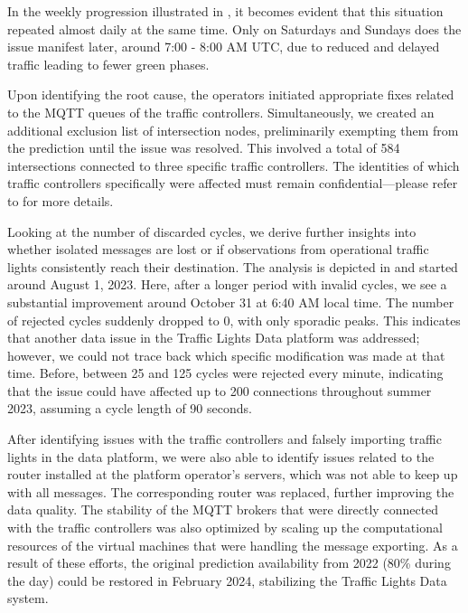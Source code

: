 In the weekly progression illustrated in , it becomes evident that this situation repeated almost daily at the same time. Only on Saturdays and Sundays does the issue manifest later, around 7:00 - 8:00 AM UTC, due to reduced and delayed traffic leading to fewer green phases.

Upon identifying the root cause, the operators initiated appropriate fixes related to the MQTT queues of the traffic controllers. Simultaneously, we created an additional exclusion list of intersection nodes, preliminarily exempting them from the prediction until the issue was resolved. This involved a total of 584 intersections connected to three specific traffic controllers. The identities of which traffic controllers specifically were affected must remain confidential—please refer to \cite{neuner_leitfaden_2020} for more details.

Looking at the number of discarded cycles, we derive further insights into whether isolated messages are lost or if observations from operational traffic lights consistently reach their destination. The analysis is depicted in  and started around August 1, 2023. Here, after a longer period with invalid cycles, we see a substantial improvement around October 31 at 6:40 AM local time. The number of rejected cycles suddenly dropped to 0, with only sporadic peaks. This indicates that another data issue in the Traffic Lights Data platform was addressed; however, we could not trace back which specific modification was made at that time. Before, between 25 and 125 cycles were rejected every minute, indicating that the issue could have affected up to 200 connections throughout summer 2023, assuming a cycle length of 90 seconds. 

After identifying issues with the traffic controllers and falsely importing traffic lights in the data platform, we were also able to identify issues related to the router installed at the platform operator's servers, which was not able to keep up with all messages. The corresponding router was replaced, further improving the data quality. The stability of the MQTT brokers that were directly connected with the traffic controllers was also optimized by scaling up the computational resources of the virtual machines that were handling the message exporting. As a result of these efforts, the original prediction availability from 2022 (80\% during the day) could be restored in February 2024, stabilizing the Traffic Lights Data system.

